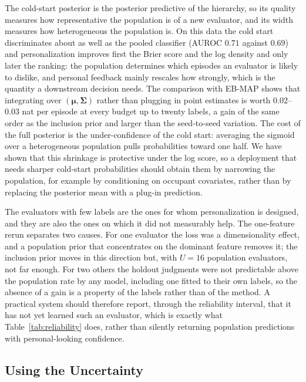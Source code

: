 \documentclass[lettersize,journal]{IEEEtran}
\begin{document}
The cold-start posterior is the posterior predictive of the hierarchy, so its quality measures how representative the population is of a new evaluator, and its width measures how heterogeneous the population is. On this data the cold start discriminates about as well as the pooled classifier (AUROC $0.71$ against $0.69$) and personalization improves first the Brier score and the log density and only later the ranking: the population determines which episodes an evaluator is likely to dislike, and personal feedback mainly rescales how strongly, which is the quantity a downstream decision needs. The comparison with EB-MAP shows that integrating over $(\bm\mu,\bm\Sigma)$ rather than plugging in point estimates is worth $0.02$--$0.03$ nat per episode at every budget up to twenty labels, a gain of the same order as the inclusion prior and larger than the seed-to-seed variation. The cost of the full posterior is the under-confidence of the cold start: averaging the sigmoid over a heterogeneous population pulls probabilities toward one half. We have shown that this shrinkage is protective under the log score, so a deployment that needs sharper cold-start probabilities should obtain them by narrowing the population, for example by conditioning on occupant covariates, rather than by replacing the posterior mean with a plug-in prediction.

The evaluators with few labels are the ones for whom personalization is designed, and they are also the ones on which it did not measurably help. The one-feature rerun separates two causes. For one evaluator the loss was a dimensionality effect, and a population prior that concentrates on the dominant feature removes it; the inclusion prior moves in this direction but, with $U=16$ population evaluators, not far enough. For two others the holdout judgments were not predictable above the population rate by any model, including one fitted to their own labels, so the absence of a gain is a property of the labels rather than of the method. A practical system should therefore report, through the reliability interval, that it has not yet learned such an evaluator, which is exactly what Table~\ref{tab:reliability} does, rather than silently returning population predictions with personal-looking confidence.

\subsection{Using the Uncertainty}
\end{document}
